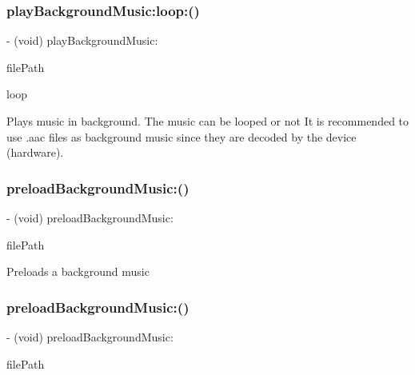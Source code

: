 \subsubsection{\texorpdfstring{play\+Background\+Music\+:loop\+:()}{playBackgroundMusic:loop:()}\hspace{0.1cm}{\footnotesize\ttfamily [4/4]}}
{\footnotesize\ttfamily -\/ (void) play\+Background\+Music\+: \begin{DoxyParamCaption}\item[{(N\+S\+String$\ast$)}]{file\+Path }\item[{loop:(B\+O\+OL)}]{loop }\end{DoxyParamCaption}}

Plays music in background. The music can be looped or not It is recommended to use .aac files as background music since they are decoded by the device (hardware). \mbox{\label{interfaceCDAudioManager_a613d13a6227a90dd5a073dbde1ac447b}} 
\subsubsection{\texorpdfstring{preload\+Background\+Music\+:()}{preloadBackgroundMusic:()}\hspace{0.1cm}{\footnotesize\ttfamily [1/4]}}
{\footnotesize\ttfamily -\/ (void) preload\+Background\+Music\+: \begin{DoxyParamCaption}\item[{(N\+S\+String $\ast$)}]{file\+Path }\end{DoxyParamCaption}}

Preloads a background music \mbox{\label{interfaceCDAudioManager_a613d13a6227a90dd5a073dbde1ac447b}} 
\subsubsection{\texorpdfstring{preload\+Background\+Music\+:()}{preloadBackgroundMusic:()}\hspace{0.1cm}{\footnotesize\ttfamily [2/4]}}
{\footnotesize\ttfamily -\/ (void) preload\+Background\+Music\+: \begin{DoxyParamCaption}\item[{(N\+S\+String $\ast$)}]{file\+Path }\end{DoxyParamCaption}}

